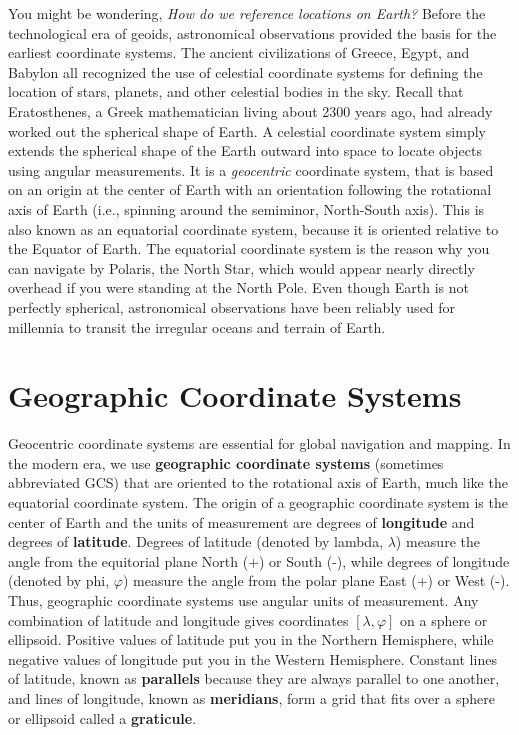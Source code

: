 \documentclass[
]{book}
\begin{document}
You might be wondering, \emph{How do we reference locations on Earth?} Before the technological era of geoids, astronomical observations provided the basis for the earliest coordinate systems. The ancient civilizations of Greece, Egypt, and Babylon all recognized the use of celestial coordinate systems for defining the location of stars, planets, and other celestial bodies in the sky. Recall that Eratosthenes, a Greek mathematician living about 2300 years ago, had already worked out the spherical shape of Earth. A celestial coordinate system simply extends the spherical shape of the Earth outward into space to locate objects using angular measurements. It is a \emph{geocentric} coordinate system, that is based on an origin at the center of Earth with an orientation following the rotational axis of Earth (i.e., spinning around the semiminor, North-South axis). This is also known as an equatorial coordinate system, because it is oriented relative to the Equator of Earth. The equatorial coordinate system is the reason why you can navigate by Polaris, the North Star, which would appear nearly directly overhead if you were standing at the North Pole. Even though Earth is not perfectly spherical, astronomical observations have been reliably used for millennia to transit the irregular oceans and terrain of Earth.

\hypertarget{geographic-coordinate-systems}{%
\section{Geographic Coordinate Systems}\label{geographic-coordinate-systems}}

Geocentric coordinate systems are essential for global navigation and mapping. In the modern era, we use \textbf{geographic coordinate systems} (sometimes abbreviated GCS) that are oriented to the rotational axis of Earth, much like the equatorial coordinate system. The origin of a geographic coordinate system is the center of Earth and the units of measurement are degrees of \textbf{longitude} and degrees of \textbf{latitude}. Degrees of latitude (denoted by lambda, \(λ\)) measure the angle from the equitorial plane North (+) or South (-), while degrees of longitude (denoted by phi, \(φ\)) measure the angle from the polar plane East (+) or West (-). Thus, geographic coordinate systems use angular units of measurement. Any combination of latitude and longitude gives coordinates \([λ,φ]\) on a sphere or ellipsoid. Positive values of latitude put you in the Northern Hemisphere, while negative values of longitude put you in the Western Hemisphere. Constant lines of latitude, known as \textbf{parallels} because they are always parallel to one another, and lines of longitude, known as \textbf{meridians}, form a grid that fits over a sphere or ellipsoid called a \textbf{graticule}.
\end{document}
